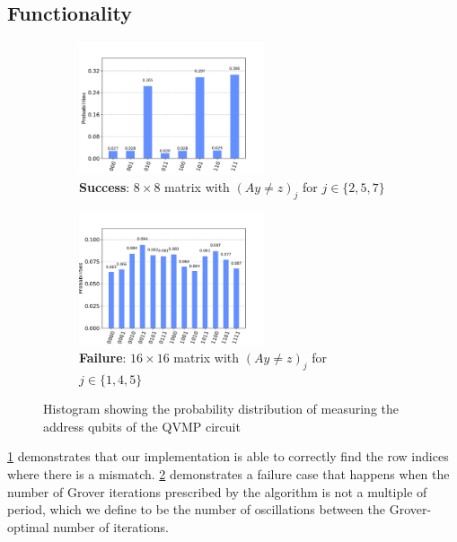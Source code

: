 \documentclass[conference]{IEEEtran}
\begin{document}


\subsection{Functionality}

\begin{figure}
  \centering
  \begin{subfigure}{0.48\textwidth}
    \centering
    \includegraphics[width=0.6\textwidth]{../../results/figures/qvmp_functionality_found_unknown.pdf}
    \caption{\textbf{Success}: $8 \times 8$ matrix with $(Ay \neq z)_j$ for $j \in \{2, 5, 7\}$}
    \label{fig:qvmp_functionality_success}
  \end{subfigure}
  \begin{subfigure}{0.48\textwidth}
    \centering
    \includegraphics[width=0.6\textwidth]{../../results/figures/qvmp_functionality_pfound_unknown__1.pdf}
    \caption{\textbf{Failure}: $16 \times 16$ matrix with $(Ay \neq z)_j$ for $j \in \{1, 4, 5\}$}
    \label{fig:qvmp_functionality_failure}
  \end{subfigure}
  \caption{Histogram showing the probability distribution of measuring the
  address qubits of the QVMP circuit}
  \label{fig:qvmp_functionality}
\end{figure}

\cref{fig:qvmp_functionality_success} demonstrates that our implementation is
able to correctly find the row indices where there is a mismatch.
\cref{fig:qvmp_functionality_failure} demonstrates a failure case that happens
when the number of Grover iterations prescribed by the algorithm is not a
multiple of period, which we define to be the number of oscillations between the
Grover-optimal number of iterations.
\end{document}
